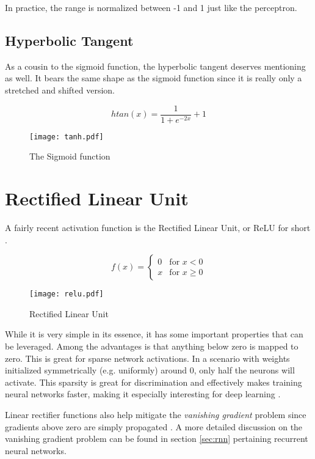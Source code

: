 In practice, the range is normalized between -1 and 1
just like the perceptron.

\subsection{Hyperbolic Tangent}
As a cousin to the sigmoid function, the hyperbolic tangent
deserves mentioning as well.
It bears the same shape as the sigmoid function
since it is really only a stretched
and shifted version.

\begin{equation}
\label{eq.ml.tanh}
htan(x) = \frac{1}{1 + e^{-2x}}+1
\end{equation}

\begin{figure}[h]
\center
\texttt{[image: tanh.pdf]}
\caption{The Sigmoid function}
\label{fig.ml.htan}
\end{figure}

\section{Rectified Linear Unit}
\label{sec:relu}
A fairly recent activation function is the
Rectified Linear Unit, or ReLU for short
\parencite{Nair2010}.

\begin{equation}
\label{eq.relu}
f(x) =
\begin{cases}
0 & \text{for } x < 0 \\
x & \text{for } x \geq 0
\end{cases}
\end{equation}

\begin{figure}[h]
\center
\texttt{[image: relu.pdf]}
\caption{Rectified Linear Unit}
\label{fig.ml.relu}
\end{figure}

While it is very simple in its essence,
it has some important properties
that can be leveraged.
Among the advantages is that anything
below zero is mapped to zero.
This is great for sparse
network activations.
In a scenario with weights initialized
symmetrically (e.g. uniformly) around 0,
only half the neurons will activate.
This sparsity is great for discrimination
and effectively makes training
neural networks faster,
making it especially interesting for
deep learning
\parencite{Y.2015a}.

Linear rectifier functions also help mitigate
the \textit{vanishing gradient} problem
since gradients above zero
are simply propagated
\parencite{Glorot2011}.
A more detailed discussion on the vanishing gradient problem
can be found in section \ref{sec:rnn}
pertaining recurrent neural networks.

